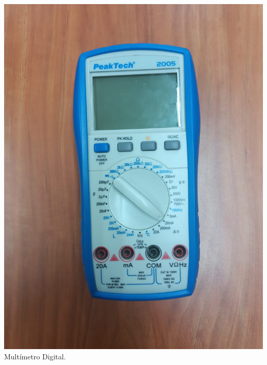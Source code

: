 \documentclass[10pt]{article}
\begin{document}
\begin{multicols}{2}
\begin{center}
	\includegraphics[scale = 0.1]{Imagenes/Material/MultiD.jpeg}\\
	Multímetro Digital.


\end{center}
\end{multicols}
\end{document}
